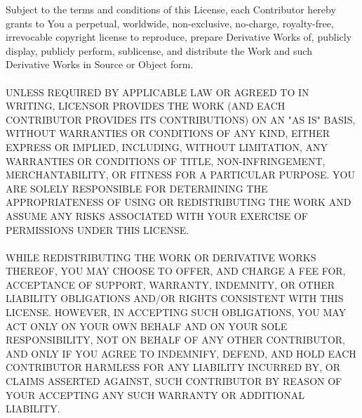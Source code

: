 \begin{addmargin}[4.5em]{0em}
    \fontsize{10pt}{12pt}\selectfont
    Subject to the terms and conditions of this License, each Contributor hereby grants to
    You a perpetual, worldwide, non-exclusive, no-charge, royalty-free, irrevocable copyright
    license to reproduce, prepare Derivative Works of, publicly display, publicly perform,
    sublicense, and distribute the Work and such Derivative Works in Source or Object form.
    \\ \\
    \uppercase{Unless required by applicable law or agreed to in writing,
    Licensor provides the Work (and each Contributor provides its Contributions)
    on an "AS IS" BASIS, WITHOUT WARRANTIES OR CONDITIONS OF ANY KIND, either express
    or implied, including, without limitation, any warranties or conditions of TITLE,
    NON-INFRINGEMENT, MERCHANTABILITY, or FITNESS FOR A PARTICULAR PURPOSE. You are
    solely responsible for determining the appropriateness of using or redistributing
    the Work and assume any risks associated with Your exercise of permissions under
    this License.
    \\ \\
    While redistributing the Work or Derivative Works thereof, You may choose to offer,
    and charge a fee for, acceptance of support, warranty, indemnity, or other liability
    obligations and/or rights consistent with this License. However, in accepting such
    obligations, You may act only on Your own behalf and on Your sole responsibility,
    not on behalf of any other Contributor, and only if You agree to indemnify, defend,
    and hold each Contributor harmless for any liability incurred by, or claims asserted
    against, such Contributor by reason of your accepting any such warranty or additional
    liability.}
\end{addmargin}
